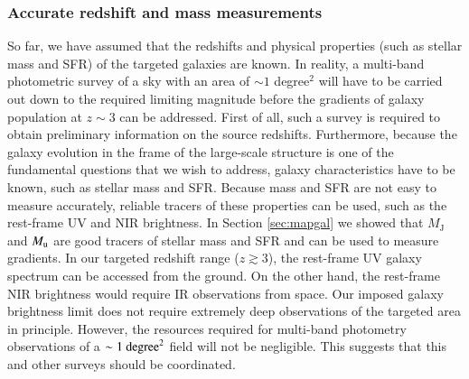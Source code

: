 \documentclass{aa}
\begin{document}
\subsubsection{Accurate redshift and mass measurements}
So far, we have assumed that the redshifts and physical properties (such as stellar mass and SFR) of the targeted galaxies are known. In reality, a multi-band photometric survey of a sky with an area of $\sim1$ degree$^2$ will have to be carried out down to the required limiting magnitude before the gradients of galaxy population at $z\sim 3$ can be addressed.
First of all, such a survey is required to obtain preliminary information on the source redshifts. Furthermore, because the galaxy evolution in the frame of the large-scale structure is one of the fundamental questions that we wish to address, galaxy characteristics have to be known, such as stellar mass and SFR. Because mass and SFR are not easy to measure accurately, reliable tracers of these properties can be used, such as the rest-frame UV and NIR brightness. In Section \ref{sec:mapgal} we showed that $M_{\mathrm{J}}$ and $M_{\rm u}$ are good tracers of stellar mass and SFR and can be used to measure gradients. In our targeted redshift range ($z \gtrsim 3$), the rest-frame UV galaxy spectrum can be accessed from the ground. On the other hand, the rest-frame NIR brightness would require  IR observations from space. Our imposed galaxy brightness limit does not require extremely deep observations of the targeted area in principle. However, the resources required for multi-band photometry observations of a $\sim 1~{\rm degree}^2$ field will not be negligible. This suggests that this and other surveys should be coordinated. 
\end{document}
